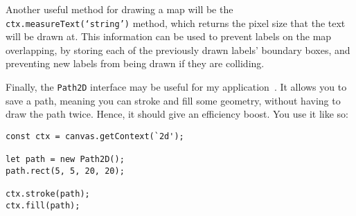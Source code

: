 \documentclass[]{final_report}
\begin{document}
Another useful method for drawing a map will be the \texttt{ctx.measureText(`string')} method, which returns the pixel size that the text will be drawn at. This information can be used to prevent labels on the map overlapping, by storing each of the previously drawn labels' boundary boxes, and preventing new labels from being drawn if they are colliding.

Finally, the \texttt{Path2D} interface may be useful for my application~\cite{mdn-canvas-path-2d}. It allows you to save a path, meaning you can stroke and fill some geometry, without having to draw the path twice. Hence, it should give an efficiency boost. You use it like so:

\begin{Verbatim}
const ctx = canvas.getContext(`2d');

let path = new Path2D();
path.rect(5, 5, 20, 20);

ctx.stroke(path);
ctx.fill(path);
\end{Verbatim}

\printbibliography{}
\end{document}
